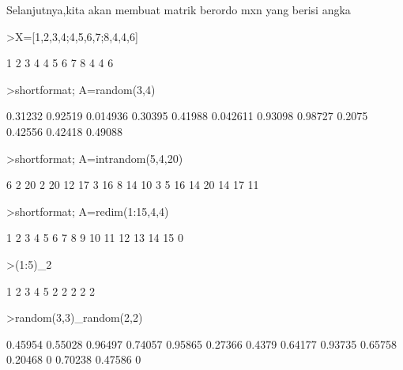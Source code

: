 \documentclass[a4paper,10pt]{article}
\begin{document}
\begin{eulernotebook}
\begin{eulercomment}
\begin{eulercomment}
\begin{eulercomment}
\begin{eulercomment}
\begin{eulercomment}
\begin{eulercomment}
\begin{eulercomment}
\begin{eulercomment}
\begin{eulercomment}
\begin{eulercomment}
\begin{eulercomment}
Selanjutnya,kita akan membuat matrik berordo mxn yang berisi angka
\end{eulercomment}
\begin{eulerprompt}
>X=[1,2,3,4;4,5,6,7;8,4,4,6]
\end{eulerprompt}
\begin{euleroutput}
              1             2             3             4 
              4             5             6             7 
              8             4             4             6 
\end{euleroutput}
\begin{eulerprompt}
>shortformat; A=random(3,4)
\end{eulerprompt}
\begin{euleroutput}
    0.31232   0.92519  0.014936   0.30395 
    0.41988  0.042611   0.93098   0.98727 
     0.2075   0.42556   0.42418   0.49088 
\end{euleroutput}
\begin{eulerprompt}
>shortformat; A=intrandom(5,4,20)
\end{eulerprompt}
\begin{euleroutput}
          6         2        20         2 
         20        12        17         3 
         16         8        14        10 
          3         5        16        14 
         20        14        17        11 
\end{euleroutput}
\begin{eulerprompt}
>shortformat; A=redim(1:15,4,4)
\end{eulerprompt}
\begin{euleroutput}
          1         2         3         4 
          5         6         7         8 
          9        10        11        12 
         13        14        15         0 
\end{euleroutput}
\begin{eulerprompt}
>(1:5)_2
\end{eulerprompt}
\begin{euleroutput}
          1         2         3         4         5 
          2         2         2         2         2 
\end{euleroutput}
\begin{eulerprompt}
>random(3,3)_random(2,2)
\end{eulerprompt}
\begin{euleroutput}
    0.45954   0.55028   0.96497 
    0.74057   0.95865   0.27366 
     0.4379   0.64177   0.93735 
    0.65758   0.20468         0 
    0.70238   0.47586         0 

\end{euleroutput}
\end{eulercomment}
\end{eulercomment}
\end{eulercomment}
\end{eulercomment}
\end{eulercomment}
\end{eulercomment}
\end{eulercomment}
\end{eulercomment}
\end{eulercomment}
\end{eulercomment}
\end{eulernotebook}
\end{document}

